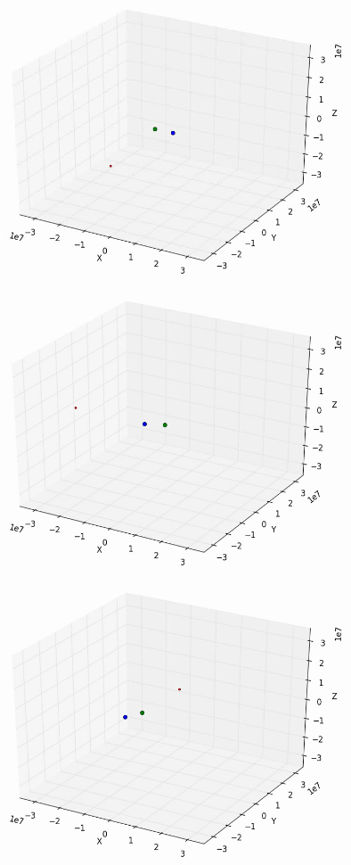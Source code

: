 \documentclass[10pt,letterpaper]{article}
\begin{document}
\begin{figure}[!htb]
  \includegraphics[width=\linewidth]{figures/three_body/2_1.png}
  \subcaption{}\label{fig:2_1}
\endminipage\hfill
{}
  \includegraphics[width=\linewidth]{figures/three_body/2_2.png}
  \subcaption{}\label{fig:2_2}
\endminipage\hfill
{}
  \includegraphics[width=\linewidth]{figures/three_body/2_3.png}

\end{figure}
\end{document}
